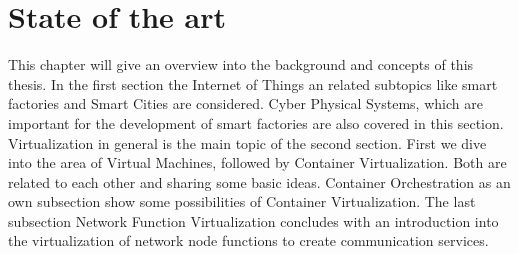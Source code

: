 


\chapter{State of the art}\label{chapter:state-of-the-art}
This chapter will give an overview into the background and concepts of this thesis.
In the first section the Internet of Things an related subtopics like smart factories and Smart Cities are considered.
Cyber Physical Systems, which are important for the development of smart factories are also covered in this section.
Virtualization in general is the main topic of the second section.
First we dive into the area of Virtual Machines, followed by Container Virtualization.
Both are related to each other and sharing some basic ideas.
Container Orchestration as an own subsection show some possibilities of Container Virtualization.
The last subsection Network Function Virtualization concludes with an introduction into the virtualization of network node functions to create communication services.


